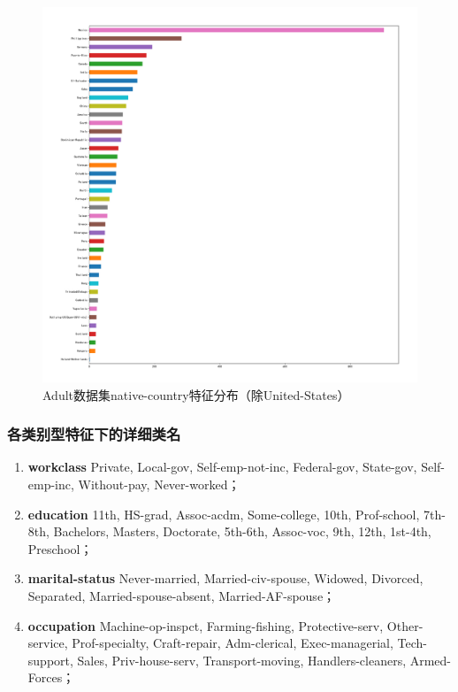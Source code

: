 \documentclass[12pt,a4paper]{article}
\theoremstyle{definition}
\begin{document}
\begin{appendix}
	\vspace{-0.02\linewidth}
	\begin{figure}[H]
		\centering
		\includegraphics[width=0.75\linewidth]{img/native_country_dis2.pdf}
		\caption{Adult数据集native-country特征分布（除United-States）}
		\label{fig:class_feature_dis_detail}
	\end{figure}
	
	\subsubsection{各类别型特征下的详细类名}
	\label{apd:classes}
	
	\begin{enumerate}
	
	\item \textbf{workclass} Private, Local-gov, Self-emp-not-inc, Federal-gov, State-gov, Self-emp-inc, Without-pay, Never-worked；
	
	\item \textbf{education} 11th, HS-grad, Assoc-acdm, Some-college, 10th, Prof-school, 7th-8th, Bachelors, Masters, Doctorate, 5th-6th, Assoc-voc, 9th, 12th, 1st-4th, Preschool；
	
	\item \textbf{marital-status} Never-married, Married-civ-spouse, Widowed, Divorced, Separated, Married-spouse-absent, Married-AF-spouse；
	
	\item \textbf{occupation} Machine-op-inspct, Farming-fishing, Protective-serv, Other-service, Prof-specialty, Craft-repair, Adm-clerical, Exec-managerial, Tech-support, Sales, Priv-house-serv, Transport-moving, Handlers-cleaners, Armed-Forces；
	

\end{enumerate}
\end{appendix}
\end{document}
